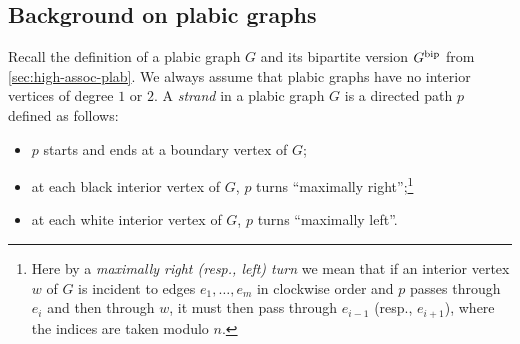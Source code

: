 \documentclass[11pt]{amsart}
\theoremstyle{plain}
\theoremstyle{definition}
\begin{document}
\subsection{Background on plabic graphs}\label{sec:backgr-plab-graphs}

Recall the definition of a plabic graph $G$ and its bipartite version $G^{{\operatorname{bip}}}$ from \cref{sec:high-assoc-plab}. We always assume that plabic graphs have no interior vertices of degree $1$ or $2$. A \emph{strand} in a plabic graph $G$ is a directed path $p$ defined as follows:
\begin{itemize}
\item $p$ starts and ends at a boundary vertex of $G$;
\item at each black interior vertex of $G$, $p$ turns ``maximally right'';\footnote{Here by a \emph{maximally right (resp., left) turn} we mean that if an interior vertex $w$ of $G$ is incident to edges $e_1,\dots,e_m$ in clockwise order and $p$ passes through $e_i$ and then through $w$, it must then pass through $e_{i-1}$ (resp., $e_{i+1}$), where the indices are taken modulo $n$.}
\item at each white interior vertex of $G$, $p$ turns ``maximally left''.
\end{itemize}
\end{document}
